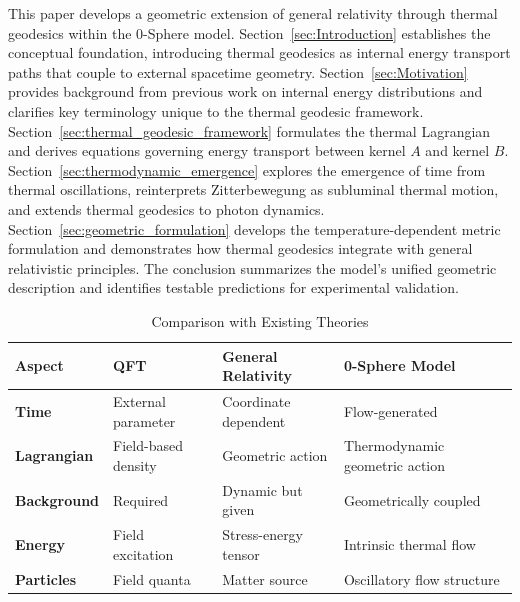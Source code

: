 \documentclass[%
 reprint,
 amsmath,amssymb,
 aps,
]{revtex4-1}
\numberwithin{equation}{section}%
\begin{document}
This paper develops a geometric extension of general relativity through thermal geodesics within the 0-Sphere model. Section~\ref{sec:Introduction} establishes the conceptual foundation, introducing thermal geodesics as internal energy transport paths that couple to external spacetime geometry. Section~\ref{sec:Motivation} provides background from previous work on internal energy distributions and clarifies key terminology unique to the thermal geodesic framework. Section~\ref{sec:thermal_geodesic_framework} formulates the thermal Lagrangian and derives equations governing energy transport between kernel $A$ and kernel $B$. Section~\ref{sec:thermodynamic_emergence} explores the emergence of time from thermal oscillations, reinterprets Zitterbewegung as subluminal thermal motion, and extends thermal geodesics to photon dynamics. Section~\ref{sec:geometric_formulation} develops the temperature-dependent metric formulation and demonstrates how thermal geodesics integrate with general relativistic principles. The conclusion summarizes the model's unified geometric description and identifies testable predictions for experimental validation.


\begin{table}[!htbp]
\caption{Comparison with Existing Theories}
\label{tab:theory_comparison}
\renewcommand{\arraystretch}{1.4}
\begin{tabular}{p{3.2cm}p{4.2cm}p{4.2cm}p{4.8cm}}
\toprule
\textbf{Aspect} & \textbf{QFT} & \textbf{General Relativity} & \textbf{0-Sphere Model} \\
\midrule
\textbf{Time} & External parameter & Coordinate dependent & Flow-generated \\
\addlinespace[0.2cm]
\textbf{Lagrangian} & Field-based density & Geometric action & Thermodynamic geometric action \\
\addlinespace[0.2cm]
\textbf{Background} & Required & Dynamic but given & Geometrically coupled \\
\addlinespace[0.2cm]
\textbf{Energy} & Field excitation & Stress-energy tensor & Intrinsic thermal flow \\
\addlinespace[0.2cm]
\textbf{Particles} & Field quanta & Matter source & Oscillatory flow structure \\
\bottomrule
\end{tabular}
\end{table}


\end{document}
